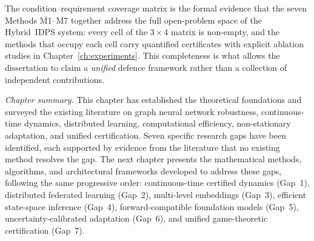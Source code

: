 The condition--requirement coverage matrix is the formal evidence that the seven Methods M1--M7 together address the full open-problem space of the Hybrid~IDPS system: every cell of the $3\times4$ matrix is non-empty, and the methods that occupy each cell carry quantified certificates with explicit ablation studies in Chapter~\ref{ch:experiments}. This completeness is what allows the dissertation to claim a \emph{unified} defence framework rather than a collection of independent contributions.

\medskip
\noindent\textit{Chapter summary.} This chapter has established the theoretical foundations and surveyed the existing literature on graph neural network robustness, continuous-time dynamics, distributed learning, computational efficiency, non-stationary adaptation, and unified certification. Seven specific research gaps have been identified, each supported by evidence from the literature that no existing method resolves the gap. The next chapter presents the mathematical methods, algorithms, and architectural frameworks developed to address these gaps, following the same progressive order: continuous-time certified dynamics (Gap~1), distributed federated learning (Gap~2), multi-level embeddings (Gap~3), efficient state-space inference (Gap~4), forward-compatible foundation models (Gap~5), uncertainty-calibrated adaptation (Gap~6), and unified game-theoretic certification (Gap~7).

